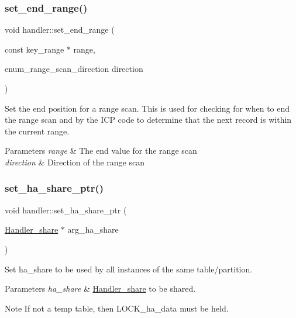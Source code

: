 \subsubsection{\texorpdfstring{set\+\_\+end\+\_\+range()}{set\_end\_range()}}
{\footnotesize\ttfamily void handler\+::set\+\_\+end\+\_\+range (\begin{DoxyParamCaption}\item[{const key\+\_\+range $\ast$}]{range,  }\item[{enum\+\_\+range\+\_\+scan\+\_\+direction}]{direction }\end{DoxyParamCaption})}

Set the end position for a range scan. This is used for checking for when to end the range scan and by the I\+CP code to determine that the next record is within the current range.


\begin{DoxyParams}{Parameters}
{\em range} & The end value for the range scan \\
\hline
{\em direction} & Direction of the range scan \\
\hline
\end{DoxyParams}
\mbox{\label{classhandler_ab24470ac1d4ac336cedbe7c245d321c9}} 
\subsubsection{\texorpdfstring{set\+\_\+ha\+\_\+share\+\_\+ptr()}{set\_ha\_share\_ptr()}}
{\footnotesize\ttfamily void handler\+::set\+\_\+ha\+\_\+share\+\_\+ptr (\begin{DoxyParamCaption}\item[{\mbox{\hyperlink{classHandler__share}{Handler\+\_\+share}} $\ast$}]{arg\+\_\+ha\+\_\+share }\end{DoxyParamCaption})\hspace{0.3cm}{\ttfamily [protected]}}

Set ha\+\_\+share to be used by all instances of the same table/partition.


\begin{DoxyParams}{Parameters}
{\em ha\+\_\+share} & \mbox{\hyperlink{classHandler__share}{Handler\+\_\+share}} to be shared.\\
\hline
\end{DoxyParams}
\begin{DoxyNote}{Note}
If not a temp table, then L\+O\+C\+K\+\_\+ha\+\_\+data must be held. 
\end{DoxyNote}
\mbox{\label{classhandler_acdaf7319a6498f655f8f07b1b34b12fc}} 

